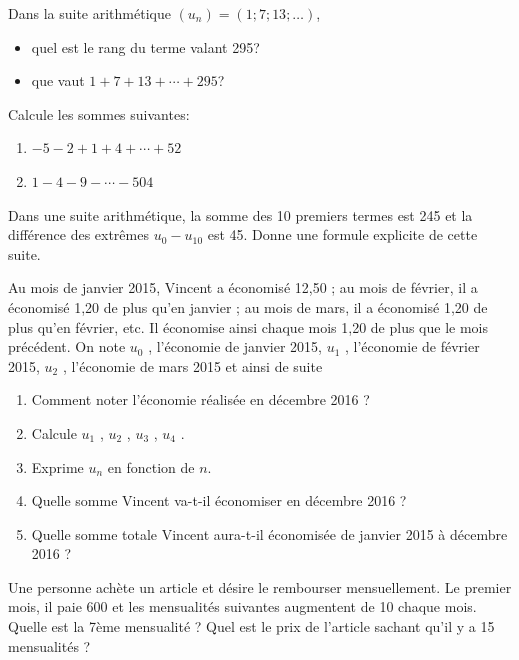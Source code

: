 \documentclass[a4paper,12pt]{report}
\begin{document}
\begin{exercice}
Dans la suite arithmétique \((u_n)=(1;7;13;\ldots)\),
\begin{itemize}
\item quel est le rang du terme valant 295?
\item que vaut \(1+7+13+\cdots+295\)?
\end{itemize}
\end{exercice}

\begin{exercice}
Calcule les sommes suivantes:
\begin{enumerate}
\item \(-5-2+1+4+\cdots+52\)
\item \(1-4-9-\cdots-504\)
\end{enumerate}
\end{exercice}

\begin{exercice}
Dans une suite arithmétique, la somme des 10 premiers termes est 245
et la différence des extrêmes \(u_0-u_{10}\)  est 45. Donne une formule
explicite de cette suite.
\end{exercice}

\begin{exercice}
Au mois de janvier 2015, Vincent a économisé 12,50\texteuro{} ; au mois de
février, il a économisé 1,20\texteuro{} de plus qu’en janvier ; au mois de
mars, il a économisé 1,20\texteuro{} de plus qu’en février, etc. Il
économise ainsi chaque mois 1,20\texteuro{} de plus que le mois précédent. On note
\(u_0\) , l’économie de janvier 2015, \(u_1\) , l’économie de février
2015, \(u_2\) , l’économie de mars 2015 et ainsi de suite

\begin{enumerate}
\item Comment noter l’économie réalisée en décembre 2016 ?
\item Calcule \(u_1\) , \(u_2\) , \(u_3\) , \(u_4\) .
\item Exprime \(u_n\) en fonction de \(n\).
\item Quelle somme Vincent va-t-il économiser en décembre 2016 ?
\item Quelle somme totale Vincent aura-t-il économisée de janvier 2015 à
décembre 2016 ?
\end{enumerate}
\end{exercice}

\begin{exercice}
Une personne achète un article et désire le rembourser
mensuellement. Le premier mois, il paie 600\texteuro{} et les mensualités
suivantes augmentent de 10\texteuro{} chaque mois. Quelle  est la 7ème
mensualité ? Quel est le prix de l’article sachant qu’il y a 15
mensualités ?
\end{exercice}
\end{document}
